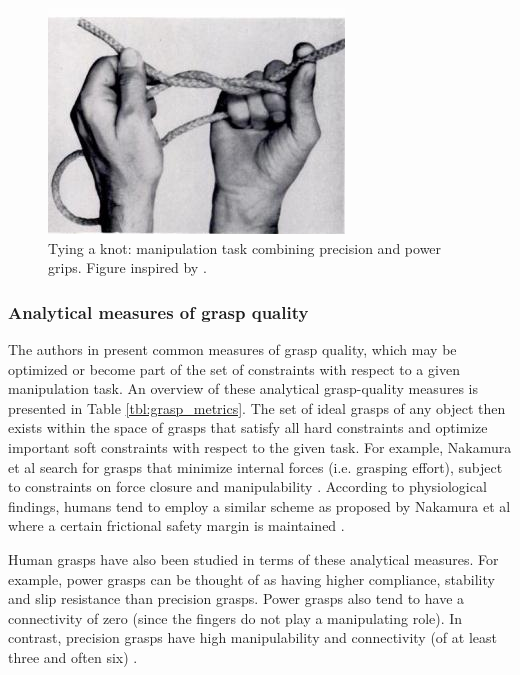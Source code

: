 \begin{figure}[]
	\centering
	\includegraphics[width=\linewidth]{images/tie_rope}
	\caption{Tying a knot: manipulation task combining precision and power grips. Figure inspired by \cite{napier1956prehensile}.}
	\label{fig:tie_rope}
\end{figure}


\subsubsection*{Analytical measures of grasp quality}
The authors in \cite{cutkosky1990human} present common measures of grasp quality, which may be optimized or become part of the set of constraints with respect to a given manipulation task.
An overview of these analytical grasp-quality measures is presented in Table \ref{tbl:grasp_metrics}.
The set of ideal grasps of any object then exists within the space of grasps that satisfy all hard constraints and optimize important soft constraints with respect to the given task.
For example, Nakamura et al search for grasps that minimize internal forces (i.e. grasping effort), subject to constraints on force closure and manipulability \cite{nakamura1987mechanics}.
According to physiological findings, humans tend to employ a similar scheme as proposed by Nakamura et al where a certain frictional safety margin is maintained \cite{ring1968paper}.

Human grasps have also been studied in terms of these analytical measures.
For example, power grasps can be thought of as having higher compliance, stability and slip resistance than precision grasps.
Power grasps also tend to have a connectivity of zero (since the fingers do not play a manipulating role).
In contrast, precision grasps have high manipulability and connectivity (of at least three and often six) \cite{cutkosky1990human}.

